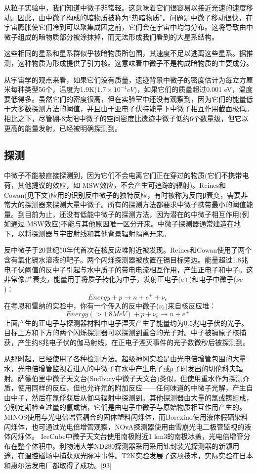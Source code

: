 从粒子实验中，我们知道中微子非常轻。这意味着它们很容易以接近光速的速度移动。因此，由中微子构成的暗物质被称为“热暗物质”。问题是中微子移动很快，在宇宙膨胀使它们冷到可以聚集成团之前，它们会在宇宙中均匀分布。这将导致由中微子组成的暗物质部分被涂抹掉，而无法形成我们看到的大星系结构。

这些相同的星系和星系群似乎被暗物质所包围，其速度不足以逃离这些星系。据推测，这种物质为形成提供了引力核。这意味着中微子不是构成暗物质的主要成分。

从宇宙学的观点来看，如果它们没有质量，遗迹背景中微子的密度估计为每立方厘米每种类型56个，温度为1.9K($1.7\times10^{-4}eV$)，如果它们的质量超过0.001 eV，温度要低得多。虽然它们的密度很高，但在实验室中还没有观察到，因为它们的能量低于大多数探测方法的阈值，并且由于亚电子伏特能量下中微子相互作用截面极低。相比之下，尽管硼-8太阳中微子的空间密度比遗迹中微子低约6个数量级，但它以更高的能量发射，已经被明确探测到。

\subsection{探测}
中微子不能被直接探测到，因为它们不会电离它们正在穿过的物质(它们不携带电荷，其他提议的效应，如 MSW效应，不会产生可追踪的辐射)。Reines和Cowan(见下文)应用的识别反中微子的独特反应，有时被称为反向β衰变，需要非常大的探测器来探测大量中微子。所有的探测方法都要求中微子携带最小的阈值能量。到目前为止，还没有低能中微子的探测方法，因为潜在的中微子相互作用(例如通过 MSW效应)不能与其他原因唯一区分开来。中微子探测器通常建造在地下，以将探测器与宇宙射线和其他背景辐射隔离开来。

反中微子于20世纪50年代首次在核反应堆附近被发现。Reines和Cowan使用了两个含有氯化镉水溶液的靶子。两个闪烁探测器被放置在镉目标旁边。能量超过1.8兆电子伏阈值的反中子引起与水中质子的带电电流相互作用，产生正电子和中子。这非常像$\beta^+$衰变，能量用于将质子转化为中子，发射正电子(e+)和电子中微子($\nu e$ )：
$$Energy+p \to n+e^+ +\nu_e~$$
在考恩和雷纳的实验中，你有一个传入的反中微子($\nu_e$)来自核反应堆：
$$Energy(>1.8 MeV)+p+\nu_e\to n+e^+~$$
上面产生的正电子与探测器材料中电子湮灭产生了能量约为0.5兆电子伏的光子。目标上方和下方的两个闪烁探测器可以探测到重合的光子对。中子被镉原子核捕获，产生约8兆电子伏的伽马射线，在正电子湮灭事件的光子数微秒后被探测到。

从那时起，已经使用了各种检测方法。超级神冈实验是由光电倍增管包围的大量水，光电倍增管监视着进入的中微子在水中产生电子或μ子时发出的切伦科夫辐射。萨德伯里中微子天文台(Sudbury中微子天文台)类似，但使用重水作为探测介质，使用同样的反应，但也允许氘的附加反应——任何味道的中微子光解，产生自由中子，然后在氯俘获后从伽马辐射中探测到。其他探测器由大量的氯或镓组成，分别定期检查过量的氩或锗，它们是由电子中微子与原始物质相互作用产生的。MINOS使用与光电倍增管耦合的固体塑料闪烁体，而Borexino使用液体假硒染料闪烁体，也可通过光电倍增管观察，NOνA探测器使用由雪崩光电二极管监视的液体闪烁体。 IceCube中微子天文台使用南极附近1 km3的南极冰盖，光电倍增管分布在整个体积中。利物浦大学ND280探测器采用采用钆封装光探测器的新颖用途，在温控磁场中捕获双光脉冲事件。T2K实验发展了这项技术，实际实验在日本和惠尔法发电厂都取得了成功。[93]

